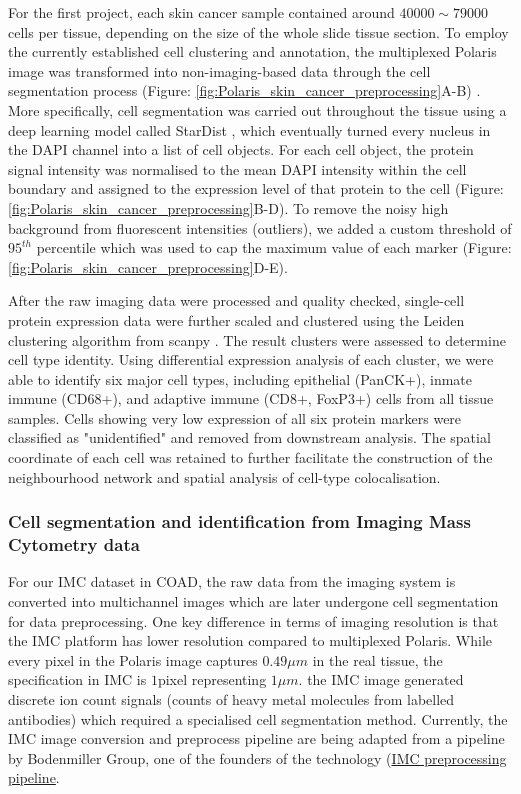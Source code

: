 For the first project, each skin cancer sample contained around $40000\sim 79000$ cells per tissue, depending on the size of the whole slide tissue section. To employ the currently established cell clustering and annotation, the multiplexed Polaris image was transformed into non-imaging-based data through the cell segmentation process (Figure: \ref{fig:Polaris_skin_cancer_preprocessing}A-B) \cite{hickey2021strategies}. More specifically, cell segmentation was carried out throughout the tissue using a deep learning model called StarDist \cite{schmidt2018cell}, which eventually turned every nucleus in the DAPI channel into a list of cell objects. For each cell object, the protein signal intensity was normalised to the mean DAPI intensity within the cell boundary and assigned to the expression level of that protein to the cell (Figure: \ref{fig:Polaris_skin_cancer_preprocessing}B-D). To remove the noisy high background from fluorescent intensities (outliers), we added a custom threshold of $95^{th}$ percentile which was used to cap the maximum value of each marker (Figure: \ref{fig:Polaris_skin_cancer_preprocessing}D-E). 

After the raw imaging data were processed and quality checked, single-cell protein expression data were further scaled and clustered using the Leiden clustering algorithm from scanpy \cite{wolf2018scanpy}. The result clusters were assessed to determine cell type identity. Using differential expression analysis of each cluster, we were able to identify six major cell types, including epithelial (PanCK+), inmate immune (CD68+), and adaptive immune (CD8+, FoxP3+) cells from all tissue samples. Cells showing very low expression of all six protein markers were classified as "unidentified" and removed from downstream analysis. The spatial coordinate of each cell was retained to further facilitate the construction of the neighbourhood network and spatial analysis of cell-type colocalisation. 

\subsubsection{Cell segmentation and identification from Imaging Mass Cytometry data}
For our IMC dataset in COAD, the raw data from the imaging system is converted into multichannel images which are later undergone cell segmentation for data preprocessing. One key difference in terms of imaging resolution is that the IMC platform has lower resolution compared to multiplexed Polaris. While every pixel in the Polaris image captures $0.49 \mu m$ in the real tissue, the specification in IMC is $1$pixel representing $1\mu m$. the IMC image generated discrete ion count signals (counts of heavy metal molecules from labelled antibodies) which required a specialised cell segmentation method. Currently, the IMC image conversion and preprocess pipeline are being adapted from a pipeline by Bodenmiller Group, one of the founders of the technology (\href{https://github.com/BodenmillerGroup/ImcSegmentationPipeline/blob/development/scripts/imc_preprocessing.ipynb}{IMC preprocessing pipeline}. 

